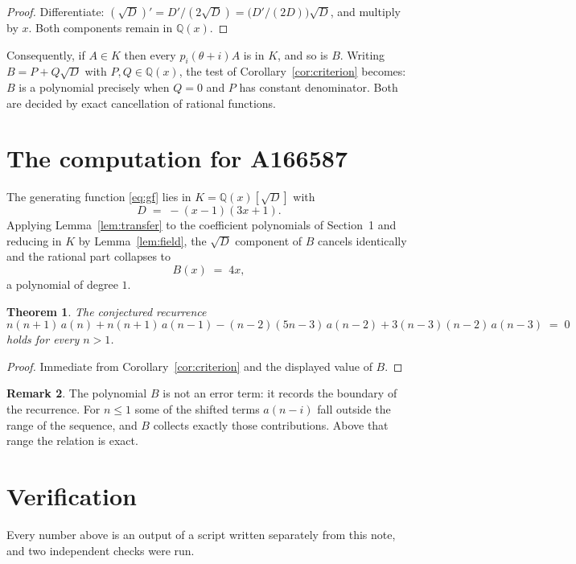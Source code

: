 \documentclass[11pt,a4paper]{article}
\theoremstyle{plain}
\newtheorem{theorem}{Theorem}
\theoremstyle{definition}
\newtheorem{remark}[theorem]{Remark}
\begin{document}
\begin{proof}
Differentiate: $(\sqrt{D})'=D'/(2\sqrt{D})=\bigl(D'/(2D)\bigr)\sqrt{D}$, and multiply by
$x$. Both components remain in $\mathbb{Q}(x)$.
\end{proof}

Consequently, if $A\in K$ then every $p_{i}(\theta+i)A$ is in $K$, and so is $B$. Writing
$B=P+Q\sqrt{D}$ with $P,Q\in\mathbb{Q}(x)$, the test of Corollary~\ref{cor:criterion}
becomes: $B$ is a polynomial precisely when $Q=0$ and $P$ has constant denominator. Both
are decided by exact cancellation of rational functions.

\section{The computation for A166587}

The generating function \eqref{eq:gf} lies in $K=\mathbb{Q}(x)[\sqrt{D}]$ with
\[
D \;=\; - \left(x - 1\right) \left(3 x + 1\right) .
\]
Applying Lemma~\ref{lem:transfer} to the coefficient polynomials of Section~1 and reducing
in $K$ by Lemma~\ref{lem:field}, the $\sqrt{D}$ component of $B$ cancels identically and
the rational part collapses to
\[
B(x)\;=\;4 x ,
\]
a polynomial of degree $1$.

\begin{theorem}
The conjectured recurrence
\[
n \left(n + 1\right)\,a(n) + n \left(n + 1\right)\,a(n-1) -  \left(n - 2\right) \left(5 n - 3\right)\,a(n-2) + 3 \left(n - 3\right) \left(n - 2\right)\,a(n-3) \;=\;0
\]
holds for every $n>1$.
\end{theorem}

\begin{proof}
Immediate from Corollary~\ref{cor:criterion} and the displayed value of $B$.
\end{proof}

\begin{remark}
The polynomial $B$ is not an error term: it records the boundary of the recurrence. For
$n\le1$ some of the shifted terms $a(n-i)$ fall outside the range of the sequence,
and $B$ collects exactly those contributions. Above that range the relation is exact.
\end{remark}

\section{Verification}

Every number above is an output of a script written separately from this note, and two
independent checks were run.
\end{document}

